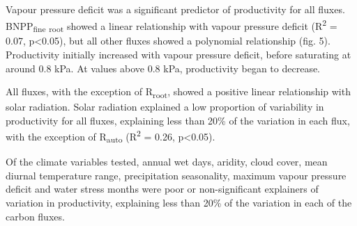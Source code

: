 \documentclass[]{article}
\begin{document}
Vapour pressure deficit was a significant predictor of productivity for
all fluxes. BNPP\textsubscript{fine} \textsubscript{root} showed a
linear relationship with vapour pressure deficit (R\textsuperscript{2} =
0.07, p\textless{}0.05), but all other fluxes showed a polynomial
relationship (fig. 5). Productivity initially increased with vapour
pressure deficit, before saturating at around 0.8 kPa. At values above
0.8 kPa, productivity began to decrease.

All fluxes, with the exception of R\textsubscript{root}, showed a
positive linear relationship with solar radiation. Solar radiation
explained a low proportion of variability in productivity for all
fluxes, explaining less than 20\% of the variation in each flux, with
the exception of R\textsubscript{auto} (R\textsuperscript{2} = 0.26,
p\textless{}0.05).

Of the climate variables tested, annual wet days, aridity, cloud cover,
mean diurnal temperature range, precipitation seasonality, maximum
vapour pressure deficit and water stress months were poor or
non-significant explainers of variation in productivity, explaining less
than 20\% of the variation in each of the carbon fluxes.
\end{document}
